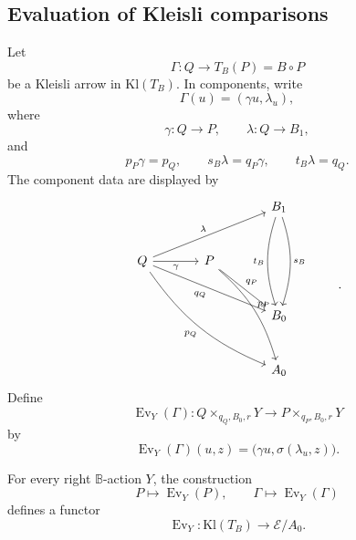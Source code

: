 \subsection{Evaluation of Kleisli comparisons}
\label{subsec:relative-evaluation-kleisli-comparisons}

\begin{definition}
\label{def:relative-kleisli-comparison-evaluation}
Let
\[
\Gamma:Q\to T_B(P)=B\circ P
\]
be a Kleisli arrow in \(\mathrm{Kl}(T_B)\). In components, write
\[
\Gamma(u)=(\gamma u,\lambda_u),
\]
where
\[
\gamma:Q\to P,
\qquad
\lambda:Q\to B_1,
\]
and
\[
p_P\gamma=p_Q,
\qquad
s_B\lambda=q_P\gamma,
\qquad
t_B\lambda=q_Q.
\]
The component data are displayed by
\[
\begin{tikzcd}[column sep=large,row sep=large]
&& B_1
  \arrow[dd,bend left=18,"s_B"]
  \arrow[dd,bend right=18,"t_B"']
&
\\
Q
  \arrow[rru,"\lambda"]
  \arrow[r,"\gamma"']
  \arrow[drr,"q_Q"']
  \arrow[ddrr,bend right=16,"p_Q"']
&
P
  \arrow[dr,"q_P"]
  \arrow[rdd,bend left=16,"p_P"]
&&
\\
&& B_0 &
\\
&& A_0 &
\end{tikzcd}
.
\]
Define
\[
\operatorname{Ev}_Y(\Gamma):
Q\times_{q_Q,B_0,r}Y
\longrightarrow
P\times_{q_P,B_0,r}Y
\]
by
\[
\operatorname{Ev}_Y(\Gamma)(u,z)
=
\bigl(\gamma u,\sigma(\lambda_u,z)\bigr).
\]
\end{definition}

\begin{proposition}
\label{prop:relative-evaluation-functorial}
For every right \(\mathbb B\)-action \(Y\), the construction
\[
P\longmapsto \operatorname{Ev}_Y(P),
\qquad
\Gamma\longmapsto \operatorname{Ev}_Y(\Gamma)
\]
defines a functor
\[
\operatorname{Ev}_Y:\mathrm{Kl}(T_B)\to \mathcal E/A_0.
\]
\end{proposition}

